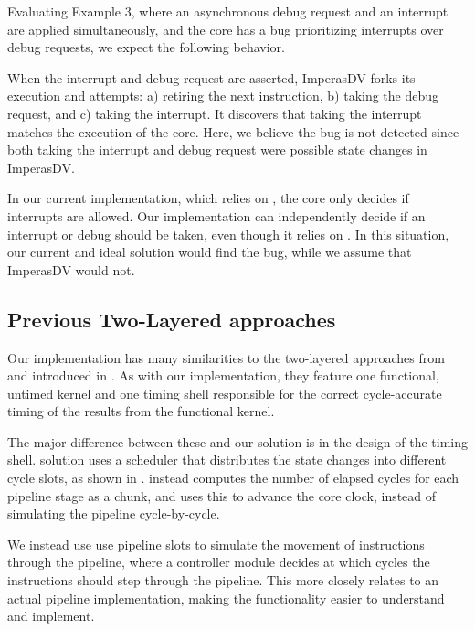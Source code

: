 Evaluating Example 3, where an asynchronous debug request and an interrupt are applied simultaneously, and the core has a bug prioritizing interrupts over debug requests, we expect the following behavior.

When the interrupt and debug request are asserted, ImperasDV forks its execution and attempts: a) retiring the next instruction, b) taking the debug request, and c) taking the interrupt. It discovers that taking the interrupt matches the execution of the core. Here, we believe the bug is not detected since both taking the interrupt and debug request were possible state changes in ImperasDV. 

\begin{sloppy}
In our current implementation, which relies on , the core only decides if interrupts are allowed. Our implementation can independently decide if an interrupt or debug should be taken, even though it relies on \mbox{}. In this situation, our current and ideal solution would find the bug, while we assume that ImperasDV would not. 
\end{sloppy}

\subsection{Previous Two-Layered approaches}

Our implementation has many similarities to the two-layered approaches from \textcite{leeFaCSimFastCycleAccurate2008} and \textcite{chiangEfficientTwolayeredCycleaccurate2009} introduced in . As with our implementation, they feature one functional, untimed kernel and one timing shell responsible for the correct cycle-accurate timing of the results from the functional kernel. 

The major difference between these and our solution is in the design of the timing shell. \textcite{chiangEfficientTwolayeredCycleaccurate2009} solution uses a scheduler that distributes the state changes into different cycle slots, as shown in . 
\textcite{leeFaCSimFastCycleAccurate2008} instead computes the number of elapsed cycles for each pipeline stage as a chunk, and uses this to advance the core clock, instead of simulating the pipeline cycle-by-cycle.

We instead use use pipeline slots to simulate the movement of instructions through the pipeline, where a controller module decides at which cycles the instructions should step through the pipeline. This more closely relates to an actual pipeline implementation, making the functionality easier to understand and implement.

